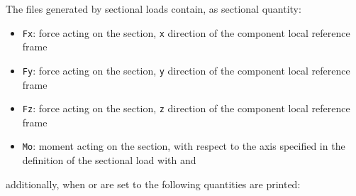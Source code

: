 The files generated by sectional loads contain, as sectional quantity:
\begin{itemize}
    \item \texttt{Fx}: force acting on the section, \texttt{x} direction of the component local reference frame
    \item \texttt{Fy}: force acting on the section, \texttt{y} direction of the component local reference frame
    \item \texttt{Fz}: force acting on the section, \texttt{z} direction of the component local reference frame
    \item \texttt{Mo}: moment acting on the section, with respect to the axis specified in the definition of the sectional load with  and 
\end{itemize}
additionally, when  or  are set to  the following quantities are printed:
